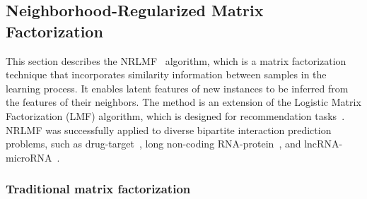 


\subsection{Neighborhood-Regularized Matrix Factorization}
\label{sec:nrlmf}

This section describes the NRLMF~\cite{liu2016neighborhood} algorithm, which is a matrix factorization technique that incorporates similarity information between samples in the learning process. It enables latent features of new instances to be inferred from the features of their neighbors.
The method is an extension of the Logistic Matrix Factorization (LMF) algorithm, which is designed for recommendation tasks~\cite{johnsonlogistic}.
NRLMF was successfully applied to diverse bipartite interaction prediction problems, such as drug-target~\cite{liu2016neighborhood}, long non-coding RNA-protein~\cite{liu2017lpinrlmf}, and lncRNA-microRNA~\cite{liu2020predicting}.


\subsubsection{Traditional matrix factorization}
\label{sec:traditional matrix factorization}



